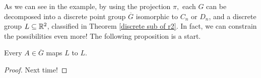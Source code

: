 As we can see in the example, by using the projection $\pi,$ each $G$ can be decomposed into a discrete point group $\overline{G}$ isomorphic to $C_n$ or $D_n$, and a discrete group $L \subseteq \mathbb R^2$, classified in Theorem \ref{discrete sub of r2}. In fact, we can constrain the possibilities even more! The following proposition is a start.

\begin{proposition}
Every $A \in \overline{G}$ maps $L$ to $L.$
\end{proposition}
\begin{proof}
Next time!
\end{proof}


\newpage